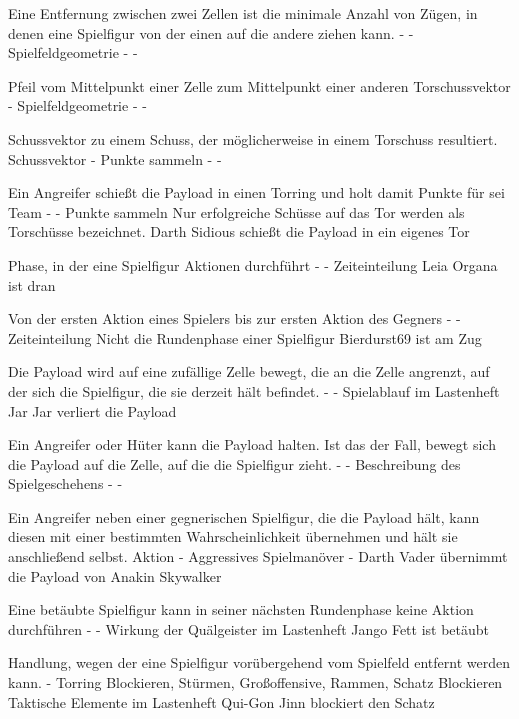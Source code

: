 {Eine Entfernung zwischen zwei Zellen ist die minimale Anzahl von Zügen, in denen eine Spielfigur von der einen auf die andere ziehen kann.}
{-}
{-}
{Spielfeldgeometrie}
{-}
{-}

{Pfeil vom Mittelpunkt einer Zelle zum Mittelpunkt einer anderen}
{Torschussvektor}
{-}
{Spielfeldgeometrie}
{-}
{-}

{Schussvektor zu einem Schuss, der möglicherweise in einem Torschuss resultiert.}
{Schussvektor}
{-}
{Punkte sammeln}
{-}
{-}

{Ein Angreifer schießt die Payload in einen Torring und holt damit Punkte für sei Team}
{-}
{-}
{Punkte sammeln}
{Nur erfolgreiche Schüsse auf das Tor werden als Torschüsse bezeichnet.}
{Darth Sidious schießt die Payload in ein eigenes Tor}

{Phase, in der eine Spielfigur Aktionen durchführt}
{-}
{-}
{Zeiteinteilung}
{}
{Leia Organa ist dran}

{Von der ersten Aktion eines Spielers bis zur ersten Aktion des Gegners}
{-}
{-}
{Zeiteinteilung}
{Nicht die Rundenphase einer Spielfigur}
{Bierdurst69 ist am Zug}

{Die Payload wird auf eine zufällige Zelle bewegt, die an die Zelle angrenzt, auf der sich die Spielfigur, die sie derzeit hält befindet.}
{-}
{-}
{Spielablauf}
{\grqq im Lastenheft}
{Jar Jar verliert die Payload}

{Ein Angreifer oder Hüter kann die Payload halten. Ist das der Fall, bewegt sich die Payload auf die Zelle, auf die die Spielfigur zieht.}
{-}
{-}
{Beschreibung des Spielgeschehens}
{-}
{-}

{Ein Angreifer neben einer gegnerischen Spielfigur, die die Payload hält, kann diesen mit einer bestimmten Wahrscheinlichkeit übernehmen und hält sie anschließend selbst.}
{Aktion}
{-}
{Aggressives Spielmanöver}
{-}
{Darth Vader übernimmt die Payload von Anakin Skywalker}

{Eine betäubte Spielfigur kann in seiner nächsten Rundenphase keine Aktion durchführen}
{-}
{-}
{Wirkung der Quälgeister}
{\glqqAusgeknockt\grqq im Lastenheft}
{Jango Fett ist betäubt}

{Handlung, wegen der eine Spielfigur vorübergehend vom Spielfeld entfernt werden kann.}
{-}
{Torring Blockieren, Stürmen, Großoffensive, Rammen, Schatz Blockieren}
{Taktische Elemente}
{\glqqFaul\grqq im Lastenheft}
{Qui-Gon Jinn blockiert den Schatz}

